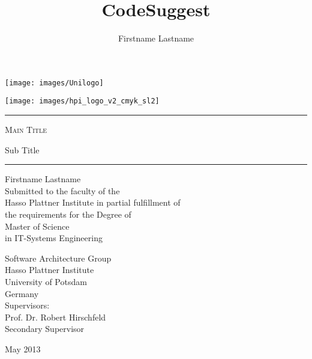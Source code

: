 \title{CodeSuggest}
\author{Firstname Lastname}
\begin{titlepage}
\pagestyle{empty}

\noindent
\begin{minipage}[b]{0.4\linewidth}
\noindent
\texttt{[image: images/Unilogo]}
\end{minipage}
\hfill
\begin{minipage}[b]{0.4\linewidth}
\hfill
\vspace{3mm}
\texttt{[image: images/hpi\_logo\_v2\_cmyk\_sl2]}
\end{minipage}

\vspace{2cm}

\begin{center}
\begin{minipage}{0.7\textwidth}
\begin{center}
\begin{large}
\hrule
\vspace{2em}
\textsc{\Huge Main Title \\[0.5em]}
\begin{doublespace}
  {\LARGE Sub Title}
  \\[1.2em]
\end{doublespace}
\hrule
\vspace{1.5cm}

{\huge Firstname Lastname } \\[1.5cm]

Submitted to the faculty of the \\
Hasso Plattner Institute in partial fulfillment of \\
the requirements for the Degree of \\[5mm]
{\Large Master of Science} \\[1mm]
in IT-Systems Engineering \\[2cm]

\begin{multicols}{2}
Software Architecture Group\\
Hasso Plattner Institute\\
University of Potsdam \\
Germany \\
Supervisors: \\
Prof. Dr. Robert Hirschfeld \\
Secondary Supervisor \\
\end{multicols}
\end{large}
\end{center}
\end{minipage}
\vfill
{\LARGE May 2013 \\ ~ }
\end{center}
\end{titlepage}
\restoregeometry
\cleardoublepage